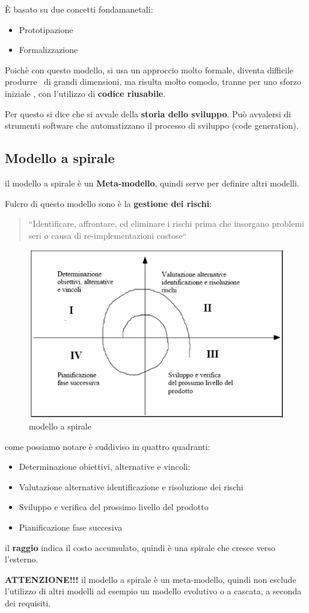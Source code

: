\`E basato su due concetti fondamanetali: 
\begin{itemize}
    \item Prototipazione
    \item Formalizzazione
\end{itemize}
Poich\`e con questo modello, si usa un approccio molto formale, diventa difficile
produrre \sw\ di grandi dimensioni, ma risulta molto comodo, tranne per uno sforzo iniziale
, con l'utilizzo di \textbf{codice riusabile}.

Per questo si dice che si avvale della \textbf{storia dello sviluppo}.
Pu\`o avvalersi di strumenti software che automatizzano il processo di sviluppo (code generation).
\subsection{Modello a spirale}
il modello a spirale \`e un \textbf{Meta-modello}, quindi serve per definire altri modelli.

Fulcro di questo modello sono \`e la \textbf{gestione dei rischi}:
\begin{quote}
    ``Identificare, affrontare, ed eliminare i rischi prima che insorgano problemi seri o causa di 
    re-implementazioni costose``
\end{quote}
\begin{figure}[htbp]
    \centering    
    \includegraphics[scale=0.7]{modello_a_spirale.PNG}
    \caption{modello a spirale}
    \label{fig:modello a spirale}
\end{figure} 
come possiamo notare \`e suddiviso in quattro quadranti:
\begin{itemize}
    \item Determinazione obiettivi, alternative e vincoli:
    \item Valutazione alternative identificazione e risoluzione dei rischi
    \item Sviluppo e verifica del prossimo livello del prodotto
    \item Pianificazione fase succesiva
\end{itemize}
il \textbf{raggio} indica il costo accumulato, quindi \`e una spirale che cresce verso l'esterno.

\textbf{ATTENZIONE!!!} il modello a spirale \`e un meta-modello, quindi non esclude l'utilizzo
di altri modelli ad esempio un modello evolutivo o a cascata, a seconda dei requisiti.